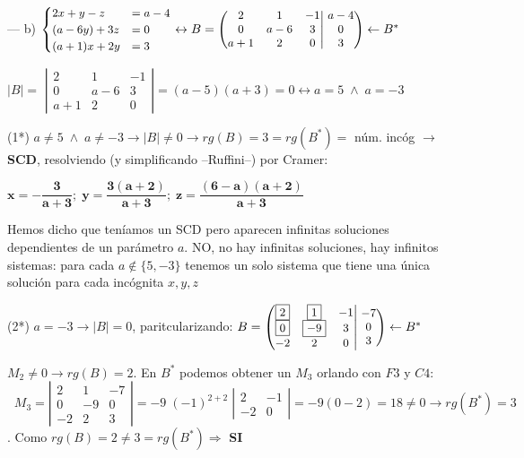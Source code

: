 \begin{proofw}
\noindent --- b) $\small{\begin{cases}  2x+y-z&=a-4\\(a-6y)+3z&=0\\(a+1)x+2y&=3   \end{cases}} \leftrightarrow B=\small{\left( \begin{matrix}    2&1&-1\\0&a-6&3\\a+1&2&0    \end{matrix} \right|  \left.    \begin{matrix} a-4\\0\\3   \end{matrix} \right)} \leftarrow B^*$

\noindent \normalsize $|B|=$ 
$\left| \begin{matrix}    2&1&-1\\0&a-6&3\\a+1&2&0    \end{matrix} \right|= (a-5)(a+3)=0 \leftrightarrow  a=5 \; \wedge \; a=-3$

\noindent (1*) $a\neq 5 \; \wedge \; a\neq -3 \to |B|\neq 0 \to rg(B)=3=rg(B^*)=$ núm. incóg $\to$ \textbf{SCD}, resolviendo (y simplificando --Ruffini--) por Cramer: 

\noindent $\boldsymbol{x=-\dfrac{3}{a+3}; \; y=\dfrac {3(a+2)}{a+3}; \; z=\dfrac {(6-a)(a+2)}{a+3} }$

\noindent \textcolor{gris}{Hemos dicho que teníamos un SCD pero aparecen infinitas soluciones dependientes de un parámetro $a$. NO, no hay infinitas soluciones, hay infinitos sistemas: para cada $a\notin \{5,-3\} $ tenemos un solo sistema que tiene una única solución para cada incógnita $x,y,z$  }

\noindent (2*) \small{$a=-3 \to |B|=0$, paritcularizando: $B=\small{\left( \begin{matrix}    \boxed{2}&\boxed{1}&-1\\\boxed{0}&\boxed{-9}&3\\-2&2&0    \end{matrix} \right|  \left.    \begin{matrix} -7\\0\\3   \end{matrix} \right)} \leftarrow B^*$}

\noindent \normalsize{$\boxed{M_2}\neq 0 \to rg(B)=2$. En $B^*$ podemos obtener un $M_3$ orlando con $F3$ y $C4$: $\; \; M_3=\left| \begin{matrix} 2&1&-7\\0&-9&0\\-2&2&3 \end{matrix} \right| = -9\; (-1)^{2+2}\; \left| \begin{matrix} 2&-1\\-2&0 \end{matrix} \right|=-9 (0-2)=18\neq 0 \to rg(B^*)=3$}. Como $rg(B)=2\neq 3 = rg(B^*) \Rightarrow $ \textbf{SI}


\end{proofw}
